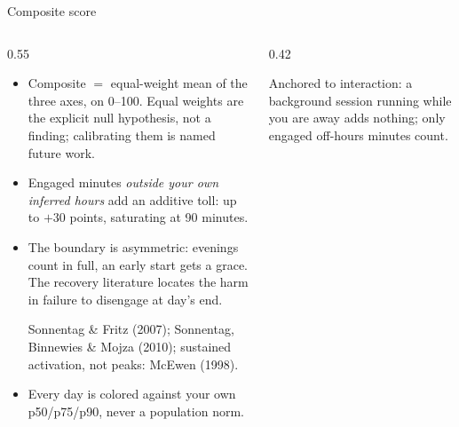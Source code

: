 \documentclass[aspectratio=169,10pt]{beamer}
\newcommand{\good}[1]{\textcolor{Sage}{#1}}
\newcommand{\warnc}[1]{\textcolor{Amber}{#1}}
\newcommand{\src}[1]{{\scriptsize\color{InkFaint}#1\par}}
\begin{document}
\begin{frame}{Composite score}
  \begin{columns}[T]
    \begin{column}{0.55\textwidth}
      \small
      \begin{itemize}
        \item Composite $=$ equal-weight mean of the three axes, on
              0--100. Equal weights are the \good{explicit null
              hypothesis}, not a finding; calibrating them is named future
              work.
        \item Engaged minutes \emph{outside your own inferred hours} add an
              additive toll: up to \warnc{$+30$ points}, saturating at
              90 minutes.
        \item The boundary is asymmetric: evenings count in full, an early
              start gets a grace. The recovery literature locates the harm
              in \alert{failure to disengage at day's end}.
              \src{Sonnentag \& Fritz (2007); Sonnentag, Binnewies \& Mojza (2010);
                   sustained activation, not peaks: McEwen (1998).}
        \item Every day is colored against \good{your own} p50/p75/p90,
              never a population norm.
      \end{itemize}
    \end{column}
    \begin{column}{0.42\textwidth}
      \centering
      \src{Anchored to interaction: a background session running while
           you are away adds nothing; only engaged off-hours minutes count.}
    \end{column}
  \end{columns}
\end{frame}
\end{document}
